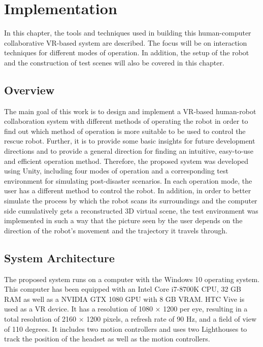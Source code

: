 \chapter{Implementation}
\label{implementation}

In this chapter, the tools and techniques used in building this human-computer collaborative VR-based system are described. The focus will be on interaction techniques for different modes of operation. In addition, the setup of the robot and the construction of test scenes will also be covered in this chapter.


\section{Overview}
The main goal of this work is to design and implement a VR-based human-robot collaboration system with different methods of operating the robot in order to find out which method of operation is more suitable to be used to control the rescue robot. Further, it is to provide some basic insights for future development directions and to provide a general direction for finding an intuitive, easy-to-use and efficient operation method. Therefore, the proposed system was developed using Unity, including four modes of operation and a corresponding test environment for simulating post-disaster scenarios. In each operation mode, the user has a different method to control the robot. In addition, in order to better simulate the process by which the robot scans its surroundings and the computer side cumulatively gets a reconstructed 3D virtual scene, the test environment was implemented in such a way that the picture seen by the user depends on the direction of the robot's movement and the trajectory it travels through.


\section{System Architecture}
The proposed system runs on a computer with the Windows 10 operating system. This computer has been equipped with an Intel Core i7-8700K CPU, 32 GB RAM as well as a NVIDIA GTX 1080 GPU with 8 GB VRAM. HTC Vive is used as a VR device. It has a resolution of 1080 × 1200 per eye, resulting in a total resolution of 2160 × 1200 pixels, a refresh rate of 90 Hz, and a field of view of 110 degrees. It includes two motion controllers and uses two Lighthouses to track the position of the headset as well as the motion controllers.

